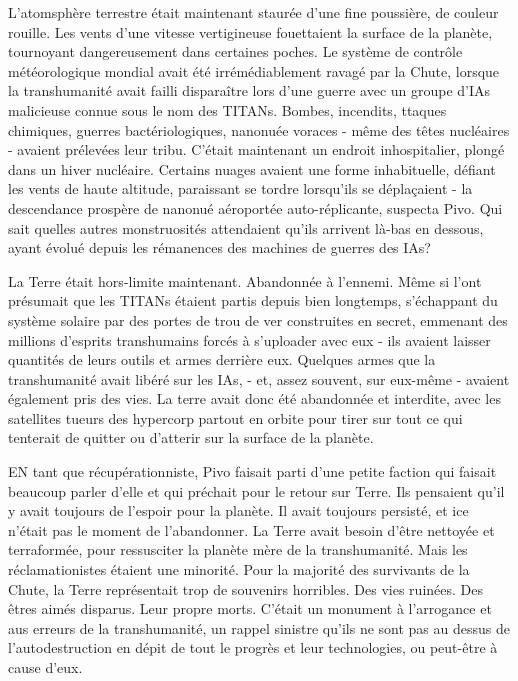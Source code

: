 L'atomsphère terrestre était maintenant staurée d'une fine poussière, de couleur rouille. Les vents d'une vitesse vertigineuse fouettaient la surface de la planète, tournoyant dangereusement dans certaines poches. Le système de contrôle météorologique mondial avait été irrémédiablement ravagé par la Chute, lorsque la transhumanité avait failli disparaître lors d'une guerre avec un groupe d'IAs malicieuse connue sous le nom des TITANs. Bombes, incendits, ttaques chimiques, guerres bactériologiques, nanonuée voraces - même des têtes nucléaires - avaient prélevées leur tribu. C'était maintenant un endroit inhospitalier, plongé dans un hiver nucléaire. Certains nuages avaient une forme inhabituelle, défiant les vents de haute altitude, paraissant se tordre lorsqu'ils se déplaçaient - la descendance prospère de nanonué aéroportée auto-réplicante, suspecta Pivo. Qui sait quelles autres monstruosités attendaient qu'ils arrivent là-bas en dessous, ayant évolué depuis les rémanences des machines de guerres des IAs? 

La Terre était hors-limite maintenant. Abandonnée à l'ennemi. Même si l'ont présumait que les TITANs étaient partis depuis bien longtemps, s'échappant du système solaire par des portes de trou de ver construites en secret, emmenant des millions d'esprits transhumains forcés à s'uploader avec eux - ils avaient laisser quantités de leurs outils et armes derrière eux. Quelques armes que la transhumanité avait libéré sur les IAs, - et, assez souvent, sur eux-même - avaient également pris des vies. La terre avait donc été abandonnée et interdite, avec les satellites tueurs des hypercorp partout en orbite pour tirer sur tout ce qui tenterait de quitter ou d'atterir sur la surface de la planète. 

EN tant que récupérationniste, Pivo faisait parti d'une petite faction qui faisait beaucoup parler d'elle et qui préchait pour le retour sur Terre. Ils pensaient qu'il y avait toujours de l'espoir pour la planète. Il avait toujours persisté, et ice n'était pas le moment de l'abandonner. La Terre avait besoin d'être nettoyée et terraformée, pour ressusciter la planète mère de la transhumanité. Mais les réclamationistes étaient une minorité. Pour la majorité des survivants de la Chute, la Terre représentait trop de souvenirs horribles. Des vies ruinées. Des êtres aimés disparus. Leur propre morts. C'était un monument à l'arrogance et aus erreurs de la transhumanité, un rappel sinistre qu'ils ne sont pas au dessus de l'autodestruction en dépit de tout le progrès et leur technologies, ou peut-être à cause d'eux. 

